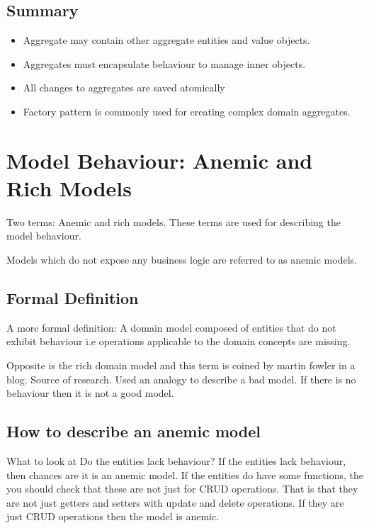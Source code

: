 \documentclass[a4paper, 11pt]{book}
\begin{document}
    \subsection{Summary}
    \begin{itemize}
    \item Aggregate may contain other aggregate entities and value objects.
    \item Aggregates must encapsulate behaviour to manage inner objects.
    \item All changes to aggregates are saved atomically
    \item Factory pattern is commonly used for creating complex domain aggregates.
    \end{itemize}


    \section{Model Behaviour: Anemic and Rich Models}

    Two terms: Anemic and rich models.
    These terms are used for describing the model behaviour.

    Models which do not expose any business logic are referred to as anemic models.

    \subsection{Formal Definition}
    A more formal definition:
    A domain model composed of entities that do not exhibit behaviour i.e operations applicable to the domain concepts are missing.

    Opposite is the rich domain model and this term is coined by martin fowler in a blog. Source of research.
    Used an analogy to describe a bad model.
    If there is no behaviour then it is not a good model.

    \subsection{How to describe an anemic model}
    What to look at
    Do the entities lack behaviour?
    If the entities lack behaviour, then chances are it is an anemic model.
    If the entities do have some functions, the you should check that these are not just for CRUD operations.
    That is that they are not just getters and setters with update and delete operations.
    If they are just CRUD operations then the model is anemic.
\end{document}
